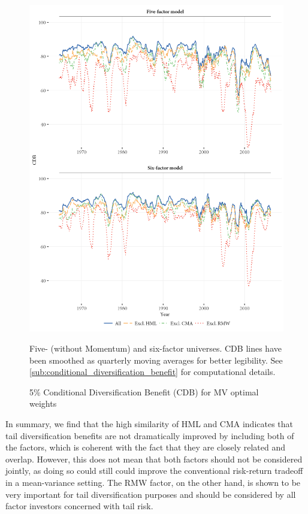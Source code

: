\begin{figure}[p]
  \centering
  \footnotesize
  \includegraphics[width=\textwidth]{graphics/cdb/MV.png}
  \caption{5\% Conditional Diversification Benefit (CDB) for MV optimal weights}

  \begin{longcaption}
    Five- (without Momentum) and six-factor universes. CDB lines have been smoothed as quarterly moving averages for better legibility. See \autoref{sub:conditional_diversification_benefit} for computational details.
  \end{longcaption}
  \label{fig:mv_cdb}
\end{figure}



In summary, we find that the high similarity of HML and CMA indicates that tail diversification benefits are not dramatically improved by including both of the factors, which is coherent with the fact that they are closely related and overlap. However, this does not mean that both factors should not be considered jointly, as doing so could still could improve the conventional risk-return tradeoff in a mean-variance setting. The RMW factor, on the other hand, is shown to be very important for tail diversification purposes and should be considered by all factor investors concerned with tail risk.

